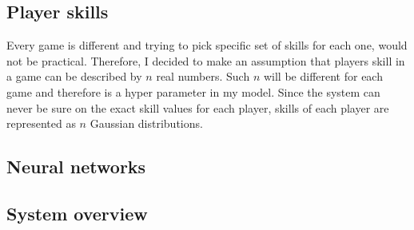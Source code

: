 \documentclass[12pt,a4paper]{book}
\begin{document}
\subsection{Player skills}
Every game is different and trying to pick specific set of skills for each one, would not be practical.
Therefore, I decided to make an assumption that players skill in a game can be described by $n$ real numbers.
Such $n$ will be different for each game and therefore is a hyper parameter in my model.
Since the system can never be sure on the exact skill values for each player, skills of each player are represented as $n$ Gaussian distributions.
\subsection{Neural networks}

\subsection{System overview}
\end{document}
